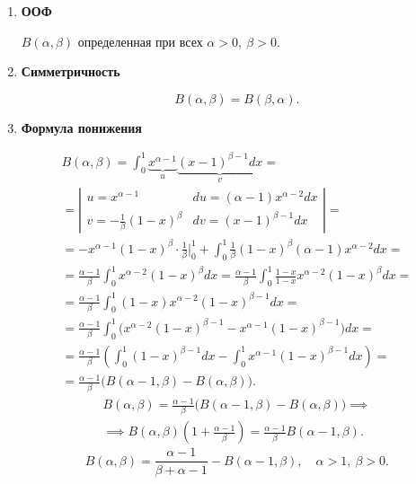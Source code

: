 \begin{enumerate}
    \item \textbf{ООФ}

          \begin{statement}
              $ B(\alpha,\beta) $ определенная при всех $ \alpha > 0, \ \beta > 0 $.
          \end{statement}

    \item \textbf{Симметричность}

          \begin{statement}
              \[
                  B(\alpha,\beta) = B(\beta,\alpha).
              \]
          \end{statement}

    \newpage

    \item \textbf{Формула понижения}

          \begin{note}
              \begin{multline*}
                  B(\alpha,\beta) = \int_{0}^{1}\underbrace{x^{\alpha-1}}_{u}\underbrace{(x-1)^{\beta-1}dx}_{v} = \\
                  = \left|\begin{array}{ll}
                      u = x^{\alpha-1}                & du = (\alpha-1)x^{\alpha-2}dx \\
                      v = -\frac{1}{\beta}(1-x)^\beta & dv = (x-1)^{\beta-1}dx
                  \end{array}\right| = \\
                  = -x^{\alpha-1}(1-x)^\beta \cdot \frac{1}{\beta}\Bigg|_0^1 + \int_{0}^{1}\frac{1}{\beta}(1-x)^\beta(\alpha - 1)x^{\alpha-2}dx = \\
                  = \frac{\alpha -1}{\beta}\int_{0}^{1}x^{\alpha-2}(1-x)^\beta dx = \frac{\alpha - 1}{\beta}\int_{0}^{1}\frac{1-x}{1-x}x^{\alpha-2}(1-x)^\beta dx = \\
                  = \frac{\alpha -1}{\beta}\int_{0}^{1}(1-x)x^{\alpha-2}(1-x)^{\beta-1}dx = \\
                  = \frac{\alpha - 1}{\beta}\int_{0}^{1}\bigl(x^{\alpha-2}(1-x)^{\beta-1} - x^{\alpha-1}(1-x)^{\beta-1}\bigr)dx = \\
                  = \frac{\alpha-1}{\beta}\left(\int_{0}^{1}(1-x)^{\beta-1}dx - \int_{0}^{1}x^{\alpha-1}(1-x)^{\beta-1}dx\right) = \\
                  = \frac{\alpha-1}{\beta}\bigl(B(\alpha-1,\beta) - B(\alpha,\beta)\bigr).
              \end{multline*}
              \begin{multline*}
                  B(\alpha,\beta) = \frac{\alpha-1}{\beta}\bigl(B(\alpha-1,\beta) - B(\alpha,\beta)\bigr) \implies \\
                  \implies B(\alpha,\beta)\left(1 + \frac{\alpha - 1}{\beta}\right) = \frac{\alpha-1}{\beta}B(\alpha-1,\beta).
              \end{multline*}
              \[
                  \boxed{B(\alpha,\beta) = \frac{\alpha -1}{\beta + \alpha -1} - B(\alpha-1,\beta)}, \quad \alpha > 1, \ \beta > 0.
              \]


\end{note}
\end{enumerate}
